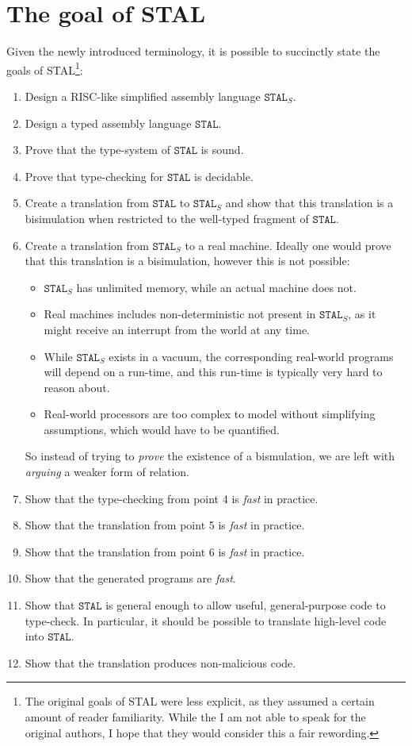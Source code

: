 \clearpage
\section{The goal of STAL}

Given the newly introduced terminology, it is possible to succinctly state the
goals of STAL\footnote{The original goals of STAL\cite{STAL} were less explicit,
  as they assumed a certain amount of reader familiarity. While the I am not
  able to speak for the original authors, I hope that they would consider this a
  fair rewording.}:

\begin{enumerate}
\item Design a RISC-like simplified assembly language $\mathtt{STAL}_S$.
\item Design a typed assembly language $\mathtt{STAL}$.
\item Prove that the type-system of $\mathtt{STAL}$ is sound.
\item Prove that type-checking for $\mathtt{STAL}$ is decidable.
\item Create a translation from $\mathtt{STAL}$ to $\mathtt{STAL}_S$ and show
  that this translation is a bisimulation when restricted to the well-typed
  fragment of $\mathtt{STAL}$.
\item Create a translation from $\mathtt{STAL}_S$ to a real machine. Ideally one
  would prove that this translation is a bisimulation, however this is not
  possible:
  \begin{itemize}
  \item $\mathtt{STAL}_S$ has unlimited memory, while an actual machine does
    not.
  \item Real machines includes non-deterministic not present in
    $\mathtt{STAL}_S$, as it might receive an interrupt from the world at any
    time.
  \item While $\mathtt{STAL}_S$ exists in a vacuum, the corresponding real-world
    programs will depend on a run-time, and this run-time is typically very hard
    to reason about.
  \item Real-world processors are too complex to model without simplifying
    assumptions, which would have to be quantified.
  \end{itemize}
  So instead of trying to \emph{prove} the existence of a bismulation, we are
  left with \emph{arguing} a weaker form of relation.
\item Show that the type-checking from point 4 is \emph{fast} in practice.
\item Show that the translation from point 5 is \emph{fast} in practice.
\item Show that the translation from point 6 is \emph{fast} in practice.
\item Show that the generated programs are \emph{fast}.
\item Show that $\mathtt{STAL}$ is general enough to allow useful,
  general-purpose code to type-check. In particular, it should be possible to
  translate high-level code into $\mathtt{STAL}$.
\item Show that the translation produces non-malicious code.
\end{enumerate}


